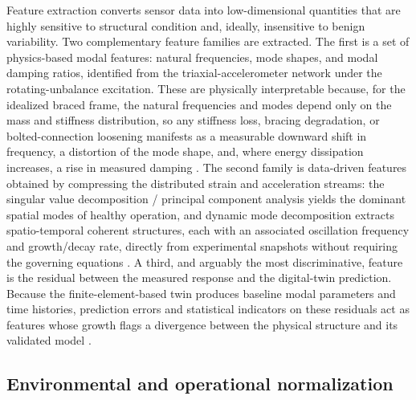 Feature extraction converts sensor data into low-dimensional quantities that are highly sensitive to structural condition and, ideally, insensitive to benign variability. Two complementary feature families are extracted. The first is a set of physics-based modal features: natural frequencies, mode shapes, and modal damping ratios, identified from the triaxial-accelerometer network under the rotating-unbalance excitation. These are physically interpretable because, for the idealized braced frame, the natural frequencies and modes depend only on the mass and stiffness distribution, so any stiffness loss, bracing degradation, or bolted-connection loosening manifests as a measurable downward shift in frequency, a distortion of the mode shape, and, where energy dissipation increases, a rise in measured damping \citep{chopra2017dynamics,farrar2013shm}. The second family is data-driven features obtained by compressing the distributed strain and acceleration streams: the singular value decomposition / principal component analysis yields the dominant spatial modes of healthy operation, and dynamic mode decomposition extracts spatio-temporal coherent structures, each with an associated oscillation frequency and growth/decay rate, directly from experimental snapshots without requiring the governing equations \citep{brunton2019data}. A third, and arguably the most discriminative, feature is the residual between the measured response and the digital-twin prediction. Because the finite-element-based twin produces baseline modal parameters and time histories, prediction errors and statistical indicators on these residuals act as features whose growth flags a divergence between the physical structure and its validated model \citep{brunton2019data,farrar2013shm}.

\subsection{Environmental and operational normalization}\label{subsec:normalization}

